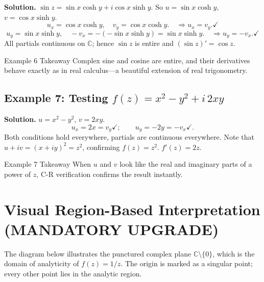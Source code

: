 \documentclass[12pt,a4paper]{article}
\begin{document}
\textbf{Solution.}  $\sin z = \sin x\cosh y + i\cos x\sinh y$.
So $u = \sin x\cosh y$, $v = \cos x\sinh y$.
\[
  u_x = \cos x\cosh y, \quad v_y = \cos x\cosh y. \quad \Rightarrow u_x = v_y.\checkmark
\]
\[
  u_y = \sin x\sinh y, \quad -v_x = -(-\sin x\sinh y) = \sin x\sinh y. \quad \Rightarrow u_y = -v_x.\checkmark
\]
All partials continuous on $\mathbb{C}$; hence $\sin z$ is entire and $(\sin z)' = \cos z$.

\begin{learnbox}{Example 6 Takeaway}
Complex sine and cosine are entire, and their derivatives behave exactly as in real calculus---a beautiful extension of real trigonometry.
\end{learnbox}

\subsection*{Example 7: Testing $f(z) = x^{2} - y^{2} + i\,2xy$}

\textbf{Solution.}  $u = x^{2}-y^{2}$, $v = 2xy$.
\[
  u_x = 2x = v_y \checkmark; \qquad u_y = -2y = -v_x \checkmark.
\]
Both conditions hold everywhere, partials are continuous everywhere.
Note that $u + iv = (x+iy)^{2} = z^{2}$, confirming $f(z) = z^{2}$.
$f'(z) = 2z$.

\begin{learnbox}{Example 7 Takeaway}
When $u$ and $v$ look like the real and imaginary parts of a power of $z$, C-R verification confirms the result instantly.
\end{learnbox}

\section{Visual Region-Based Interpretation (MANDATORY UPGRADE)}

The diagram below illustrates the punctured complex plane $\mathbb{C}\setminus\{0\}$,
which is the domain of analyticity of $f(z) = 1/z$.
The origin is marked as a singular point; every other point lies in the analytic region.
\end{document}
